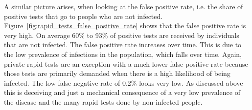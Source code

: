 \FloatBarrier

A similar picture arises, when looking at the false positive rate,
i.e. the share of positive tests that go to people who are not infected.
Figure~\ref{fig:rapid_tests_false_positive_rate} shows that the false
positive rate is very high. On average 60\% to 93\% of positive tests are
received by individuals that are not infected. The false positive rate increases over
time. This is due to the low prevalence of infections in the population, which falls
over time. Again, private rapid tests are an exception with a much lower false
positive rate because those tests are primarily demanded when there is a high likelihood
of being infected. The low false negative rate of 0.2\% looks very low. As discussed
above this is deceiving and just a mechanical consequence of a very low prevalence
of the disease and the many rapid tests done by non-infected people.

